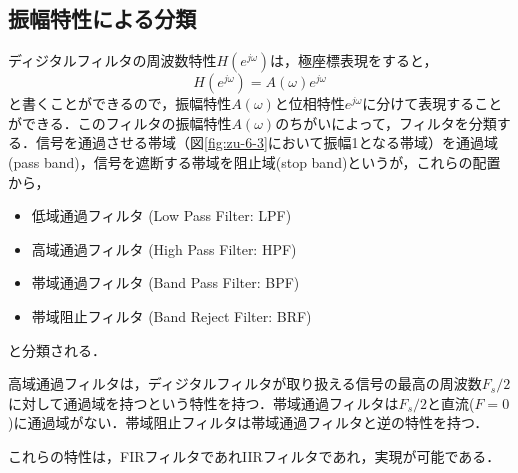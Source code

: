\subsection{振幅特性による分類}

ディジタルフィルタの周波数特性$H(e^{j\omega})$は，極座標表現をすると，
\begin{equation}
H(e^{j\omega})=A(\omega)e^{j\omega}
\end{equation}
と書くことができるので，振幅特性$A(\omega)$と位相特性$e^{j\omega}$に分けて表現することができる．このフィルタの振幅特性$A(\omega)$のちがいによって，フィルタを分類する．信号を通過させる帯域（図\ref{fig:zu-6-3}において振幅1となる帯域）を通過域(pass band)，信号を遮断する帯域を阻止域(stop band)というが，これらの配置から，
\begin{itemize}
\item 低域通過フィルタ (Low Pass Filter: LPF)
\item 高域通過フィルタ (High Pass Filter: HPF)
\item 帯域通過フィルタ (Band Pass Filter: BPF)
\item 帯域阻止フィルタ (Band Reject Filter: BRF)
\end{itemize}
と分類される．

高域通過フィルタは，ディジタルフィルタが取り扱える信号の最高の周波数$F_s/2$に対して通過域を持つという特性を持つ．帯域通過フィルタは$F_s/2$と直流($F=0$)に通過域がない．帯域阻止フィルタは帯域通過フィルタと逆の特性を持つ．

これらの特性は，FIRフィルタであれIIRフィルタであれ，実現が可能である．

